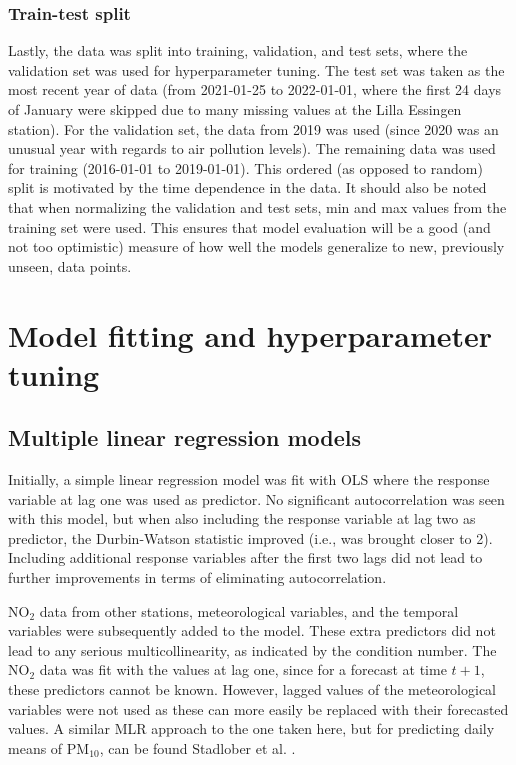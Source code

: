 \subsubsection{Train-test split} 
Lastly, the data was split into training, validation, and test sets, where the validation set was used for hyperparameter tuning. The test set was taken as the most recent year of data (from 2021-01-25 to 2022-01-01, where the first 24 days of January were skipped due to many missing values at the Lilla Essingen station). For the validation set, the data from 2019 was used (since 2020 was an unusual year with regards to air pollution levels). The remaining data was used for training (2016-01-01 to 2019-01-01). This ordered (as opposed to random) split is motivated by the time dependence in the data. It should also be noted that when normalizing the validation and test sets, min and max values from the training set were used. This ensures that model evaluation will be a good (and not too optimistic) measure of how well the models generalize to new, previously unseen, data points.

\section{Model fitting and hyperparameter tuning}

\subsection{Multiple linear regression models}
Initially, a simple linear regression model was fit with OLS where the response variable at lag one was used as predictor. No significant autocorrelation was seen with this model, but when also including the response variable at lag two as predictor, the Durbin-Watson statistic improved (i.e., was brought closer to 2). Including additional response variables after the first two lags did not lead to further improvements in terms of eliminating autocorrelation.

NO$_2$ data from other stations, meteorological variables, and the temporal variables were subsequently added to the model. These extra predictors did not lead to any serious multicollinearity, as indicated by the condition number. The NO$_2$ data was fit with the values at lag one, since for a forecast at time $t+1$, these predictors cannot be known. However, lagged values of the meteorological variables were not used as these can more easily be replaced with their forecasted values. A similar MLR approach to the one taken here, but for predicting daily means of PM$_{10}$, can be found Stadlober et al. \cite{Stadlober2008}. 

